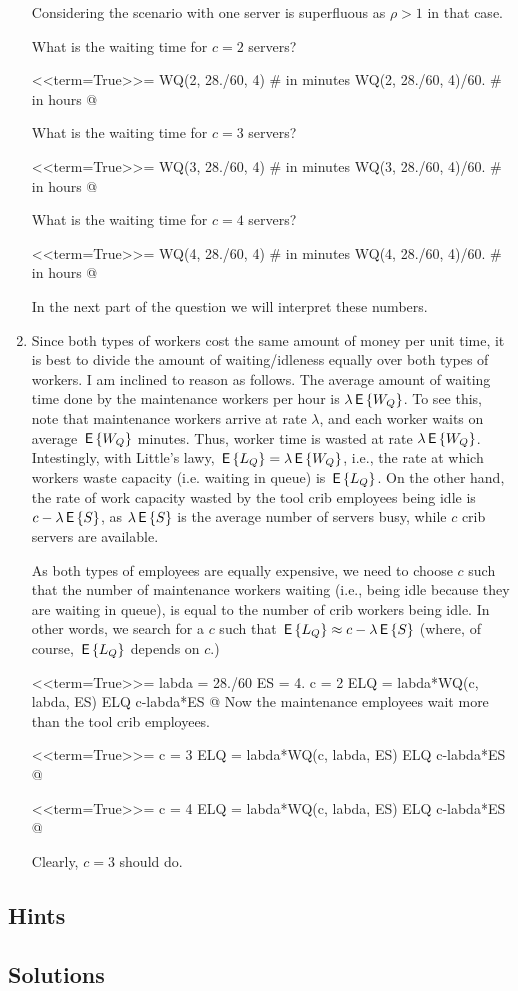\begin{exercise}
\begin{solution}
\begin{enumerate}
Considering the scenario with one server is superfluous as $\rho>1$ in
that case.

What is the waiting time for $c=2$ servers?

<<term=True>>=
WQ(2, 28./60, 4) # in minutes
WQ(2, 28./60, 4)/60. # in hours
@

What is the waiting time for $c=3$ servers?

<<term=True>>=
WQ(3, 28./60, 4)   # in minutes
WQ(3, 28./60, 4)/60. # in hours
@


What is the waiting time for $c=4$ servers?

<<term=True>>=
WQ(4, 28./60, 4) # in minutes
WQ(4, 28./60, 4)/60. # in hours
@ 

In the next  part of the question we will interpret these numbers.

\item 
Since both types of workers cost the same amount of money per unit
time, it is best to divide the amount of waiting/idleness equally over
both types of workers.  I am inclined to reason as follows. The
average amount of waiting time done by the maintenance workers per
hour is $\lambda \,\mathsf{E}\left\{W_Q\right\}$. To see this, note that maintenance workers arrive at rate $\lambda$, and each worker waits on average $\,\mathsf{E}\left\{W_Q\right\}$ minutes. Thus, worker time is wasted at rate $\lambda \,\mathsf{E}\left\{W_Q\right\}$. Intestingly, with Little's lawy, $\,\mathsf{E}\left\{L_Q\right\}=\lambda \,\mathsf{E}\left\{W_Q\right\}$, i.e., the rate at which workers waste capacity (i.e.  waiting in queue) is $\,\mathsf{E}\left\{L_Q\right\}$. On the other hand, the  rate of work capacity wasted by the tool crib employees being idle is $c-\lambda \,\mathsf{E}\left\{S\right\}$, as $\lambda \,\mathsf{E}\left\{S\right\}$ is the average number of servers busy, while $c$ crib servers are available.

As both types of
employees are equally expensive, we need to choose $c$ such that
the number of maintenance workers waiting (i.e., being idle because they are waiting in queue), is  equal to the number of crib workers being idle. In other words, we search for a $c$ such that $\,\mathsf{E}\left\{L_Q\right\} \approx c- \lambda \,\mathsf{E}\left\{S\right\}$ (where, of course, $\,\mathsf{E}\left\{L_Q\right\}$ depends on $c$.)


<<term=True>>=
labda = 28./60
ES = 4.
c = 2
ELQ = labda*WQ(c, labda, ES)
ELQ
c-labda*ES
@ 
Now the maintenance employees wait more than the tool crib employees.

<<term=True>>=
c = 3
ELQ = labda*WQ(c, labda, ES)
ELQ
c-labda*ES
@ 

<<term=True>>=
c = 4
ELQ = labda*WQ(c, labda, ES)
ELQ
c-labda*ES
@ 

Clearly, $c=3$ should do.
  \end{enumerate}
    \end{solution}
\end{exercise}






\subsection*{Hints}

\subsection*{Solutions}

\clearpage

